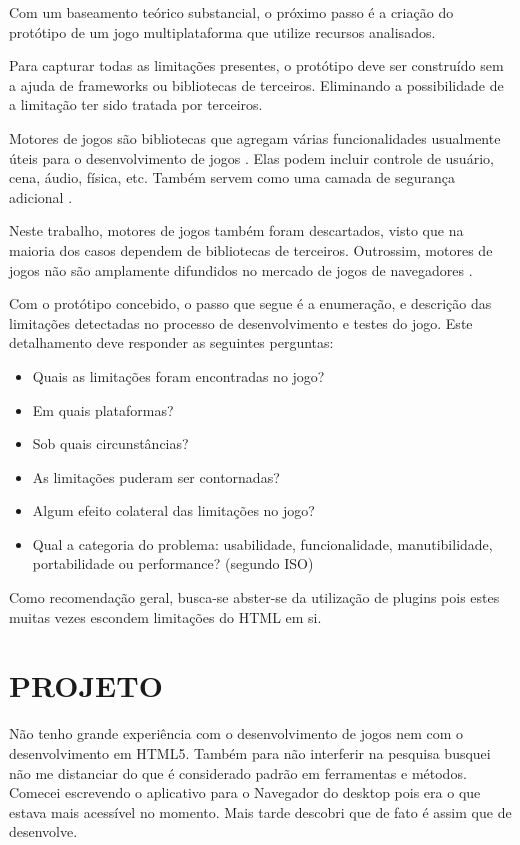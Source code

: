 \documentclass[
12pt,
a4paper,
portuges,
draft
]{report}
\begin{document}
Com um baseamento teórico substancial, o próximo passo é a criação
do protótipo de um jogo multiplataforma que utilize recursos
analisados.

Para capturar todas as limitações presentes, o protótipo deve ser
construído sem a ajuda de frameworks ou bibliotecas de terceiros.
Eliminando a possibilidade de a limitação ter sido tratada por
terceiros.

Motores de jogos são bibliotecas que agregam várias funcionalidades
usualmente úteis para o desenvolvimento de jogos \autocite[pp.
5]{browserGamesTechnologyAndFuture}. Elas podem incluir controle
de usuário, cena, áudio, física, etc. Também servem como uma camada de 
segurança adicional \autocite{browserGamesTechnologyAndFuture}.

Neste trabalho, motores de jogos também foram descartados, visto que
na maioria dos casos dependem de bibliotecas de terceiros. Outrossim,
motores de jogos não são amplamente difundidos no mercado de jogos de
navegadores \autocite{browserGamesTechnologyAndFuture}.

Com o protótipo concebido, o passo que segue é a enumeração, e
descrição das limitações detectadas no processo de desenvolvimento e
testes do jogo. Este detalhamento deve responder as seguintes perguntas:

\begin{itemize}
\item Quais as limitações foram encontradas no jogo?
\item Em quais plataformas?
\item Sob quais circunstâncias?
\item As limitações puderam ser contornadas?
\item Algum efeito colateral das limitações no jogo?
\item Qual a categoria do problema: usabilidade, funcionalidade, manutibilidade, portabilidade ou performance? (segundo ISO)
\end{itemize}

Como recomendação geral, busca-se abster-se da utilização de plugins
pois estes muitas vezes escondem limitações do HTML em si.
\chapter{PROJETO}
\thispagestyle{myheadings}

Não tenho grande experiência com o desenvolvimento de jogos nem com
o desenvolvimento em HTML5. Também para não interferir na pesquisa
busquei não me distanciar do que é considerado padrão em ferramentas
e métodos.
Comecei escrevendo o aplicativo para o Navegador do desktop pois era o
que estava mais acessível no momento. Mais tarde descobri que de fato
é assim que de desenvolve.
\end{document}

